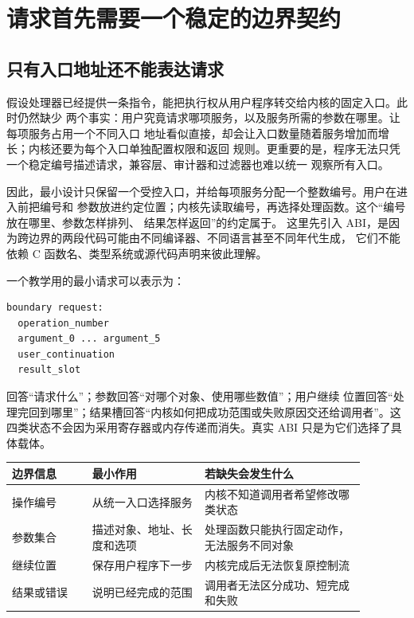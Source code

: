 \section{请求首先需要一个稳定的边界契约}

\subsection{只有入口地址还不能表达请求}

假设处理器已经提供一条指令，能把执行权从用户程序转交给内核的固定入口。此时仍然缺少
两个事实：用户究竟请求哪项服务，以及服务所需的参数在哪里。让每项服务占用一个不同入口
地址看似直接，却会让入口数量随着服务增加而增长；内核还要为每个入口单独配置权限和返回
规则。更重要的是，程序无法只凭一个稳定编号描述请求，兼容层、审计器和过滤器也难以统一
观察所有入口。

因此，最小设计只保留一个受控入口，并给每项服务分配一个整数编号。用户在进入前把编号和
参数放进约定位置；内核先读取编号，再选择处理函数。这个“编号放在哪里、参数怎样排列、
结果怎样返回”的约定属于。
这里先引入 ABI，是因为跨边界的两段代码可能由不同编译器、不同语言甚至不同年代生成，
它们不能依赖 C 函数名、类型系统或源代码声明来彼此理解。

一个教学用的最小请求可以表示为：

\begin{lstlisting}
boundary request:
  operation_number
  argument_0 ... argument_5
  user_continuation
  result_slot
\end{lstlisting}

 回答“请求什么”；参数回答“对哪个对象、使用哪些数值”；用户继续
位置回答“处理完回到哪里”；结果槽回答“内核如何把成功范围或失败原因交还给调用者”。这
四类状态不会因为采用寄存器或内存传递而消失。真实 ABI 只是为它们选择了具体载体。

\begin{longtable}{|L{0.20\linewidth}|L{0.28\linewidth}|L{0.40\linewidth}|}
\hline
边界信息 & 最小作用 & 若缺失会发生什么 \\ \hline
操作编号 & 从统一入口选择服务 & 内核不知道调用者希望修改哪类状态 \\ \hline
参数集合 & 描述对象、地址、长度和选项 & 处理函数只能执行固定动作，无法服务不同对象 \\ \hline
继续位置 & 保存用户程序下一步 & 内核完成后无法恢复原控制流 \\ \hline
结果或错误 & 说明已经完成的范围 & 调用者无法区分成功、短完成和失败 \\ \hline
\end{longtable}

